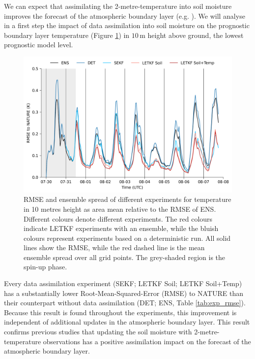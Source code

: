 \documentclass[HESSD, manuscript]{copernicus}
\begin{document}
We can expect that assimilating the 2-metre-temperature into soil moisture improves the forecast of the atmospheric boundary layer (e.g. \citet{carrera_assimilation_2019}). 
We will analyse in a first step the impact of data assimilation into soil moisture on the prognostic boundary layer temperature (Figure \ref{fig:err_t_long}) in $10\,\text{m}$ height above ground, the lowest prognostic model level.

\begin{figure}[ht]
	\includegraphics[width=\textwidth]{figures/fig_04_err_t_long.png}
	\caption{
		RMSE and ensemble spread of different experiments for temperature in 10 metres height as area mean relative to the RMSE of ENS.
		Different colours denote different experiments.
		The red colours indicate LETKF experiments with an ensemble, while the bluish colours represent experiments based on a deterministic run.
		All solid lines show the RMSE, while the red dashed line is the mean ensemble spread over all grid points.
		The grey-shaded region is the spin-up phase.
	}
	\label{fig:err_t_long}
\end{figure}

Every data assimilation experiment (SEKF; LETKF Soil; LETKF Soil+Temp) has a substantially lower Root-Mean-Squared-Error (RMSE) to NATURE than their counterpart without data assimilation (DET; ENS, Table \ref{tab:exp_rmse}).
Because this result is found throughout the experiments, this improvement is independent of additional updates in the atmospheric boundary layer.
This result confirms previous studies that updating the soil moisture with 2-metre-temperature observations has a positive assimilation impact on the forecast of the atmospheric boundary layer.
\end{document}
